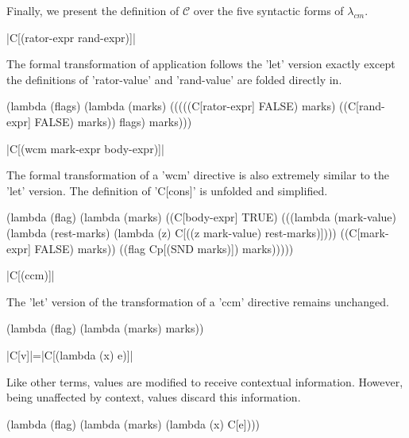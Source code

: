 \documentclass{llncs}
\newcommand{\cm}[0]{$\lambda_{cm}$}
\begin{document}
Finally, we present the definition of $\mathcal{C}$ over the five syntactic forms of \cm.


\begin{schemedefn}{\scheme|C[(rator-expr rand-expr)]|}

The formal transformation of application follows the \scheme'let' version exactly except the definitions of \scheme'rator-value' and \scheme'rand-value' are folded directly in.
\begin{schemedisplay}
(lambda (flags)
  (lambda (marks)
    (((((C[rator-expr] FALSE) marks)
       ((C[rand-expr] FALSE) marks))
      flags)
     marks)))
\end{schemedisplay}
\end{schemedefn}

\begin{schemedefn}{\scheme|C[(wcm mark-expr body-expr)]|}

The formal transformation of a \scheme'wcm' directive is also extremely similar to the \scheme'let' version. The definition of \scheme'C[cons]' is unfolded and simplified.
\begin{schemedisplay}
(lambda (flag)
  (lambda (marks)
    ((C[body-expr] TRUE)
     (((lambda (mark-value) (lambda (rest-marks) (lambda (z) C[((z mark-value) rest-marks)])))
       ((C[mark-expr] FALSE) marks))
      ((flag Cp[(SND marks)]) marks)))))
\end{schemedisplay}
\end{schemedefn}

\begin{schemedefn}{\scheme|C[(ccm)]|}

The \scheme'let' version of the transformation of a \scheme'ccm' directive remains unchanged.
\begin{schemedisplay}
(lambda (flag)
  (lambda (marks)
    marks))
\end{schemedisplay}
\end{schemedefn}

\begin{schemedefn}{\scheme|C[v]|=\scheme|C[(lambda (x) e)]|}

Like other terms, values are modified to receive contextual information. However, being unaffected by context, values discard this information.
\begin{schemedisplay}
(lambda (flag)
  (lambda (marks)
    (lambda (x) C[e])))
\end{schemedisplay}
\end{schemedefn}
\end{document}
